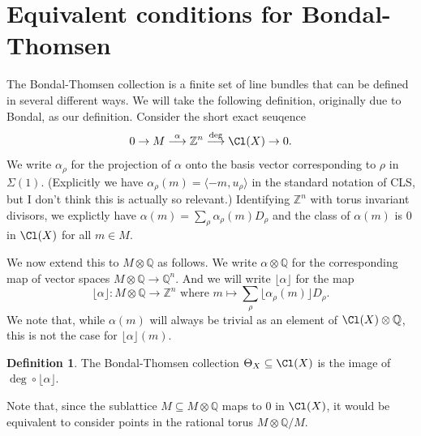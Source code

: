 \documentclass[11pt]{amsart}
\numberwithin{equation}{section}
\theoremstyle{definition}
\newtheorem{defn}[equation]{Definition}
\theoremstyle{remark}
\newcommand{\ZZ}{\mathbb Z}
\newcommand{\QQ}{\mathbb Q}
\newcommand{\defi}[1]{\textsf{#1}} %
\begin{document}
\section{Equivalent conditions for Bondal-Thomsen}

The Bondal-Thomsen collection is a finite set of line bundles that can be defined in several different ways.  We will take the following definition, originally due to Bondal, as our definition.  Consider the short exact seuqence
\[
0\to M\overset{\alpha}{\longrightarrow} \ZZ^n \overset{\deg}{\longrightarrow} \Cl(X) \to 0.
\]
We write $\alpha_\rho$ for the projection of $\alpha$ onto the basis vector corresponding to $\rho$ in $\Sigma(1)$.   (Explicitly we have $\alpha_\rho(m) = \langle -m, u_\rho\rangle$ in the standard notation of CLS, but I don't think this is actually so relevant.)
Identifying $\ZZ^n$ with torus invariant divisors, we explictly have $\alpha(m) = \sum_{\rho} \alpha_\rho(m) D_\rho$ and the class of $\alpha(m)$ is $0$ in $\Cl(X)$ for all $m\in M$.

We now extend this to $M\otimes \QQ$ as follows.  We write $\alpha\otimes {\QQ}$ for the corresponding map of vector spaces $M\otimes \QQ\to \QQ^n$.  And we will write $\lfloor \alpha \rfloor$ for the map
\[
\lfloor \alpha \rfloor\colon M\otimes \QQ \to \ZZ^n \text{ where } m\mapsto \sum_{\rho} \lfloor \alpha_\rho(m) \rfloor D_\rho.
\]
We note that, while $\alpha(m)$ will always be trivial as an element of $\Cl(X)\otimes \QQ$, this is not the case for $\lfloor \alpha \rfloor(m)$.   

\begin{defn}\label{defn:BTcollection}
    The \defi{Bondal-Thomsen collection} $\Theta_X\subseteq \Cl(X)$ is the image of $\deg \circ \lfloor \alpha \rfloor$.  
\end{defn}
Note that, since the sublattice $M\subseteq M\otimes \QQ$ maps to $0$ in $\Cl(X)$, it would be equivalent to consider points in the rational torus $M\otimes \QQ / M$.
\end{document}
